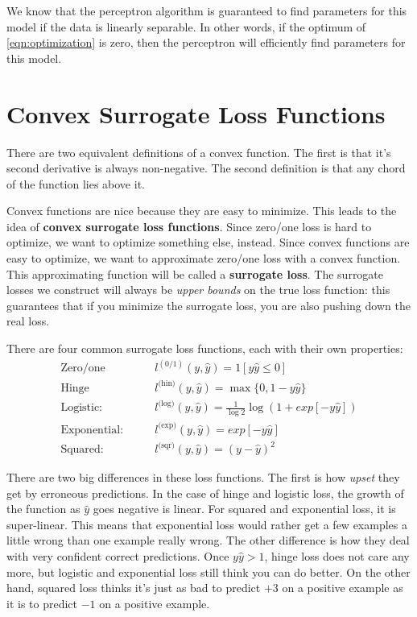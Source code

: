 We know that the perceptron algorithm is guaranteed to find parameters for this model if the data is linearly separable. In other words, if the optimum of \ref{eqn:optimization} is zero, then the perceptron will efficiently find parameters for this model.

\section{Convex Surrogate Loss Functions}
There are two equivalent definitions of a convex function. The first is that it's second derivative is always non-negative. The second definition is that any chord of the function lies above it.

Convex functions are nice because they are easy to minimize. This leads to the idea of \textbf{convex surrogate loss functions}. Since zero/one loss is hard to optimize, we want to optimize something else, instead. Since convex functions are easy to optimize, we want to approximate zero/one loss with a convex function. This approximating function will be called a \textbf{surrogate loss}. The surrogate losses we construct will always be \emph{upper bounds} on the true loss function: this guarantees that if you minimize the surrogate loss, you are also pushing down the real loss.

There are four common surrogate loss functions, each with their own properties:
\begin{align}
    \text{Zero/one}& \qquad l^{(0/1)}(y,\hat{y}) = 1[y\hat{y} \leq 0] \\
    \text{Hinge}& \qquad l^\text{(hin)}(y,\hat{y}) = \max\{0,1-y\hat{y}\} \\
    \text{Logistic:}& \qquad l^\text{(log)}(y,\hat{y}) = \frac 1 {\log 2} \log (1 + exp [-y\hat{y}]) \\
    \text{Exponential:}& \qquad l^\text{(exp)}(y,\hat{y}) = exp[-y\hat{y}] \\
    \text{Squared:}& \qquad l^\text{(sqr)}(y,\hat{y}) = (y-\hat{y})^2
\end{align}

There are two big differences in these loss functions. The first is how \emph{upset} they get by erroneous predictions. In the case of hinge and logistic loss, the growth of the function as \(\hat{y}\) goes negative is linear. For squared and exponential loss, it is super-linear. This means that exponential loss would rather get a few examples a little wrong than one example really wrong.
The other difference is how they deal with very confident correct predictions. Once \(y\hat{y}>1\), hinge loss does not care any more, but logistic and exponential loss still think you can do better. On the other hand, squared loss thinks it's just as bad to predict \(+3\) on a positive example as it is to predict \(-1\) on a positive example.


